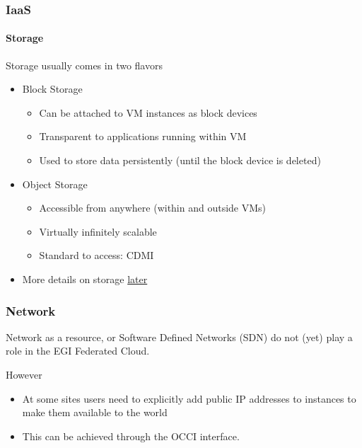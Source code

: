 \begin{frame}
\frametitle{IaaS}
\framesubtitle{Storage}
Storage usually comes in two flavors
\begin{itemize}
\item Block Storage
  \begin{itemize}
  \item Can be attached to VM instances as block devices
  \item Transparent to applications running within VM
  \item Used to store data persistently (until the block device is deleted)
  \end{itemize}
\item Object Storage
  \begin{itemize}
  \item Accessible from anywhere (within and outside VMs)
  \item Virtually infinitely scalable
  \item Standard to access: CDMI
  \end{itemize}
\item More details on storage \hyperlink{part_storage}{later}
\end{itemize}
\end{frame}

\begin{frame}
\frametitle{Network}
Network as a resource, or Software Defined Networks (SDN) do not (yet) play a role in the EGI Federated Cloud.

\vspace{1em}
However
\begin{itemize}
\item At some sites users need to explicitly add public IP addresses
  to instances to make them available to the world
\item This can be achieved through the OCCI interface.
\end{itemize}
\end{frame}

